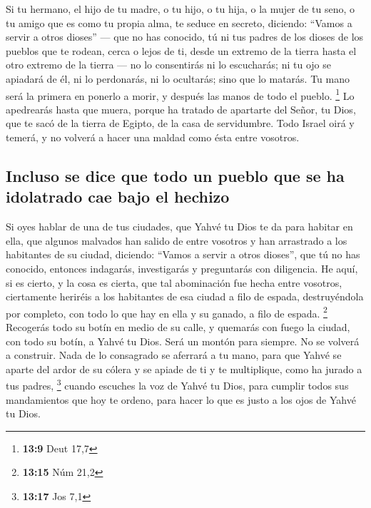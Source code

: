  Si tu hermano, el hijo de tu madre, o tu hijo, o tu hija,
o la mujer de tu seno, o tu amigo que es como tu propia alma, te seduce
en secreto, diciendo: ``Vamos a servir a otros dioses'' --- que no has
conocido, tú ni tus padres  de los dioses de los pueblos
que te rodean, cerca o lejos de ti, desde un extremo de la tierra hasta
el otro extremo de la tierra ---  no lo consentirás ni lo
escucharás; ni tu ojo se apiadará de él, ni lo perdonarás, ni lo
ocultarás;  sino que lo matarás. Tu mano será la primera
en ponerlo a morir, y después las manos de todo el pueblo. \footnote{\textbf{13:9}
  Deut 17,7}  Lo apedrearás hasta que muera, porque ha
tratado de apartarte del Señor, tu Dios, que te sacó de la tierra de
Egipto, de la casa de servidumbre.  Todo Israel oirá y
temerá, y no volverá a hacer una maldad como ésta entre vosotros.

\hypertarget{incluso-se-dice-que-todo-un-pueblo-que-se-ha-idolatrado-cae-bajo-el-hechizo}{%
\subsection{Incluso se dice que todo un pueblo que se ha idolatrado cae
bajo el
hechizo}\label{incluso-se-dice-que-todo-un-pueblo-que-se-ha-idolatrado-cae-bajo-el-hechizo}}

 Si oyes hablar de una de tus ciudades, que Yahvé tu Dios
te da para habitar en ella, que  algunos malvados han
salido de entre vosotros y han arrastrado a los habitantes de su ciudad,
diciendo: ``Vamos a servir a otros dioses'', que tú no has conocido,
 entonces indagarás, investigarás y preguntarás con
diligencia. He aquí, si es cierto, y la cosa es cierta, que tal
abominación fue hecha entre vosotros,  ciertamente
heriréis a los habitantes de esa ciudad a filo de espada, destruyéndola
por completo, con todo lo que hay en ella y su ganado, a filo de espada.
\footnote{\textbf{13:15} Núm 21,2}  Recogerás todo su
botín en medio de su calle, y quemarás con fuego la ciudad, con todo su
botín, a Yahvé tu Dios. Será un montón para siempre. No se volverá a
construir.  Nada de lo consagrado se aferrará a tu mano,
para que Yahvé se aparte del ardor de su cólera y se apiade de ti y te
multiplique, como ha jurado a tus padres, \footnote{\textbf{13:17} Jos
  7,1}  cuando escuches la voz de Yahvé tu Dios, para
cumplir todos sus mandamientos que hoy te ordeno, para hacer lo que es
justo a los ojos de Yahvé tu Dios.

